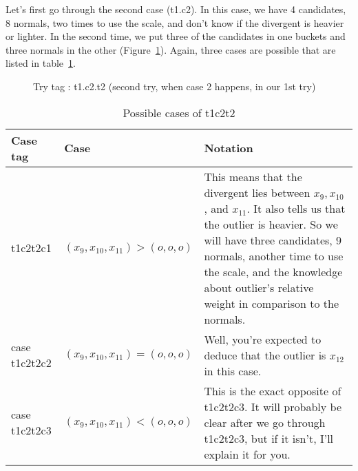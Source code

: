 \documentclass{article}
\begin{document}
Let's first go through the second case (t1.c2). In this case, we have 4 candidates, 8 normals, two times to use the scale, and don't know if the divergent is heavier or lighter. In the second time, we put three of the candidates in one buckets and three normals in the other (Figure~\ref{fig:t1c2t2}). Again, three cases are possible that are listed in table~\ref{tbl:t1c2t2cs}.
\begin{figure} %
\center
	\caption{Try tag : t1.c2.t2 (second try, when case 2 happens, in our 1st try)}
	\label{fig:t1c2t2}
\end{figure} %
\begin{table} %
	\caption{Possible cases of t1c2t2}
	\label{tbl:t1c2t2cs}
\begin{tabular}{|p{3cm}|p{5cm}|p{7cm}|}
	\hline
	Case tag& Case& Notation\\
	\hline
	\hline
	 t1c2t2c1& $(x_9, x_{10}, x_{11})>(o, o, o)$& This means that the divergent lies between $x_9, x_{10}$, and $x_{11}$. It also tells us that the outlier is heavier. So we will have three candidates, 9 normals, another time to use the scale, and the knowledge about outlier's relative weight in comparison to the normals.\\
	\hline
	case t1c2t2c2&$(x_9, x_{10}, x_{11})=(o, o, o)$& Well, you're expected to deduce that the outlier is $x_{12}$ in this case.\\
	\hline
	case t1c2t2c3& $(x_9, x_{10}, x_{11})<(o, o, o)$& This is the exact opposite of t1c2t2c3. It will probably be clear after we go through t1c2t2c3, but if it isn't, I'll explain it for you.\\
	\hline
\end{tabular}
\end{table} %
\end{document}
